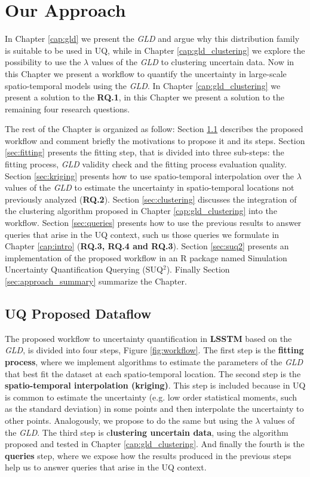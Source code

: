 \chapter{Our Approach}\label{cap:our_approach}

In Chapter \ref{cap:gld} we present the \textit{GLD} and argue why this distribution family is suitable to be used in UQ, while in Chapter \ref{cap:gld_clustering} we explore the possibility to use the $\lambda$ values of the \textit{GLD} to clustering uncertain data. Now in this Chapter we present a workflow to quantify the uncertainty in large-scale spatio-temporal models using the \textit{GLD}. In Chapter \ref{cap:gld_clustering} we present a solution to the \textbf{RQ.1}, in this Chapter we present a solution to the remaining four research questions.  

The rest of the Chapter is organized as follow: Section \ref{sec:dataflow} describes the proposed workflow and comment briefly the motivations to propose it and its steps. Section \ref{sec:fitting} presents the fitting step, that is divided into three sub-steps: the fitting process, \textit{GLD} validity check and the fitting process evaluation quality. Section \ref{sec:kriging} presents how to use spatio-temporal interpolation over the $\lambda$ values of the \textit{GLD} to estimate the uncertainty in spatio-temporal locations not previously analyzed (\textbf{RQ.2}). Section \ref{sec:clustering} discusses the integration of the clustering algorithm proposed in Chapter \ref{cap:gld_clustering} into the workflow. Section \ref{sec:queries} presents how to use the previous results to answer queries that arise in the UQ context, such us those queries we formulate in Chapter \ref{cap:intro} (\textbf{RQ.3, RQ.4 and RQ.3}).  
Section \ref{sec:suq2} presents an implementation of the proposed workflow in an R package named Simulation Uncertainty Quantification Querying (SUQ$^2$). Finally Section \ref{sec:approach_summary} summarize the Chapter.  

\section{UQ Proposed Dataflow}\label{sec:dataflow}
The proposed workflow to uncertainty quantification in \textbf{LSSTM} based on the \textit{GLD}, is divided into four steps, Figure \ref{fig:workflow}. The first step is the \textbf{fitting process}, where we implement algorithms to estimate the parameters of the \textit{GLD} that best fit the dataset at each spatio-temporal location. The second step is the \textbf{spatio-temporal interpolation (kriging)}. This step is included because in UQ is common to estimate the uncertainty (e.g. low order statistical moments, such as the standard deviation) in some points and then interpolate the uncertainty to other points. Analogously, we propose to do the same but using the $\lambda$ values of the \textit{GLD}. The third step is c\textbf{lustering uncertain data}, using the algorithm proposed and tested in Chapter \ref{cap:gld_clustering}. And finally the fourth is the \textbf{queries} step, where we expose how the results produced in the previous steps help us to answer queries that arise in the UQ context.

